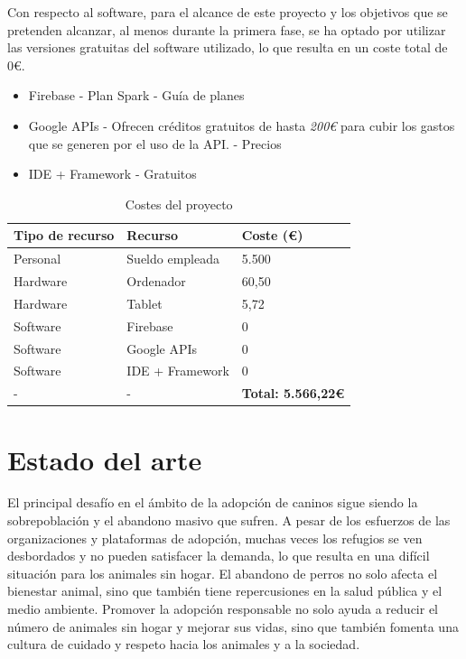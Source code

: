 \documentclass[a4paper, 12pt]{article}
\begin{document}
Con respecto al software, para el alcance de este proyecto y los objetivos que se pretenden alcanzar, al menos durante la primera fase, se ha optado por utilizar las versiones gratuitas del software utilizado, lo que resulta en un coste total de 0€.

\begin{itemize}[noitemsep]
	\item Firebase - Plan Spark - Guía de planes \cite{firebase_plans}
	\item Google APIs - Ofrecen créditos gratuitos de hasta \textit{200€} para cubir los gastos que se generen por el uso de la API. - Precios \cite{google_prices}
	\item IDE + Framework - Gratuitos
\end{itemize}


\begin{table}[H]
    \centering
    \begin{tabular}{ | m{5cm} | m{5cm} | m{5cm} | }
	    \hline \textbf{Tipo de recurso} & \textbf{Recurso} & \textbf{Coste (€)} \\ \hline
	    	Personal & Sueldo empleada & 5.500 \\ \hline
		Hardware & Ordenador & 60,50 \\ \hline
		Hardware & Tablet & 5,72 \\ \hline
	    	Software & Firebase & 0 \\ \hline
		Software & Google APIs & 0 \\ \hline
		Software & IDE + Framework & 0 \\ \hline
	   	- & -  & \textbf{Total: 5.566,22€} \\ \hline
    \end{tabular}
    \caption{Costes del proyecto}
    \label{tab:costes}
\end{table}

\newpage
\section{Estado del arte}

El principal desafío en el ámbito de la adopción de caninos sigue siendo la sobrepoblación y el abandono masivo que sufren. A pesar de los esfuerzos de las organizaciones y plataformas de adopción, muchas veces los refugios se ven desbordados y no pueden satisfacer la demanda, lo que resulta en una difícil situación para los animales sin hogar. El abandono de perros no solo afecta el bienestar animal, sino que también tiene repercusiones en la salud pública y el medio ambiente. Promover la adopción responsable no solo ayuda a reducir el número de animales sin hogar y mejorar sus vidas, sino que también fomenta una cultura de cuidado y respeto hacia los animales y a la sociedad.
\end{document}
